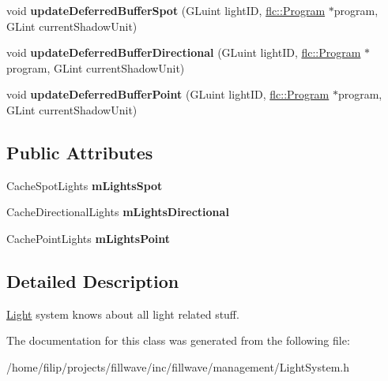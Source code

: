 \begin{DoxyCompactItemize}
void {\bfseries update\+Deferred\+Buffer\+Spot} (G\+Luint light\+ID, \hyperlink{classflw_1_1flc_1_1Program}{flc\+::\+Program} $\ast$program, G\+Lint current\+Shadow\+Unit)
\item 
\mbox{\label{classflw_1_1flf_1_1LightSystem_a8898bf26255c0aeef983943706df775b}} 
void {\bfseries update\+Deferred\+Buffer\+Directional} (G\+Luint light\+ID, \hyperlink{classflw_1_1flc_1_1Program}{flc\+::\+Program} $\ast$program, G\+Lint current\+Shadow\+Unit)
\item 
\mbox{\label{classflw_1_1flf_1_1LightSystem_a9311e0a1011ba6c1efda80d874fbcaac}} 
void {\bfseries update\+Deferred\+Buffer\+Point} (G\+Luint light\+ID, \hyperlink{classflw_1_1flc_1_1Program}{flc\+::\+Program} $\ast$program, G\+Lint current\+Shadow\+Unit)
\end{DoxyCompactItemize}
\subsection*{Public Attributes}
\begin{DoxyCompactItemize}
\item 
\mbox{\label{classflw_1_1flf_1_1LightSystem_afb42372c19f612b0b825ba3ccd63cc58}} 
Cache\+Spot\+Lights {\bfseries m\+Lights\+Spot}
\item 
\mbox{\label{classflw_1_1flf_1_1LightSystem_a59a23e29ca90a821d083f213ebc6450d}} 
Cache\+Directional\+Lights {\bfseries m\+Lights\+Directional}
\item 
\mbox{\label{classflw_1_1flf_1_1LightSystem_a92509acd5b371300c80f33241fbf9715}} 
Cache\+Point\+Lights {\bfseries m\+Lights\+Point}
\end{DoxyCompactItemize}


\subsection{Detailed Description}
\hyperlink{classflw_1_1flf_1_1Light}{Light} system knows about all light related stuff. 

The documentation for this class was generated from the following file\+:\begin{DoxyCompactItemize}
\item 
/home/filip/projects/fillwave/inc/fillwave/management/Light\+System.\+h\end{DoxyCompactItemize}
